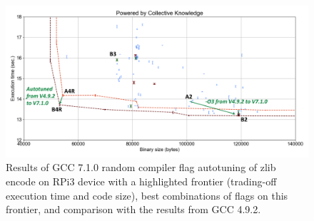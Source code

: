    \begin{figure}[!htbp]
     \centering
      \includegraphics[width=5.2in]
      {ck-assets/2318dcb514171ad4-cropped.pdf} %
      \vspace{0.1in}
      \vspace{0.1in}
     \caption{
       Results of GCC 7.1.0 random compiler flag autotuning of zlib encode on RPi3 device 
       with a highlighted frontier (trading-off execution time and code size), 
       best combinations of flags on this frontier, and comparison with the results from GCC 4.9.2.
     }
     \label{fig:autotuning-zlib-encode-gcc7}
   \end{figure}

